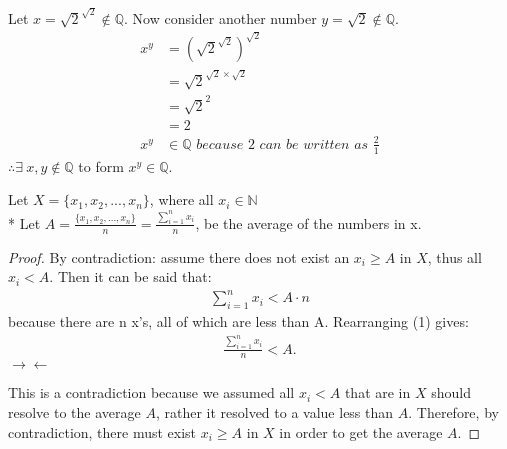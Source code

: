 \documentclass[11pt]{article}
\begin{document}
\begin{enumerate}
{{Let $x = \sqrt{2}^{\sqrt{2}} \notin \mathbb{Q}$. Now consider another number $y = \sqrt{2} \notin \mathbb{Q}$.
\begin{align*}
x^y & = (\sqrt{2}^{\sqrt{2}})^{\sqrt{2}}\\
& = \sqrt{2}^{\sqrt{2} \times \sqrt{2}} \\
& = \sqrt{2}^{2}\\
& = 2\\
x^y & \in \mathbb{Q} \textit{ because 2 can be written as } \frac{2}{1}
\end{align*}
$\therefore \exists\ x, y \notin \mathbb{Q}$ to form $x^y \in \mathbb{Q}$.
}

\item { %
Let $X = \{x_1, x_2, ..., x_n\}$, where all $x_i \in \mathbb{N}$\\*
Let $A = \frac{\{x_1, x_2, ..., x_n\}}{n} = \frac{\sum\limits_{i=1}^n x_i}{n}$, be the average of the numbers in x.

\setcounter{equation}{0}
\begin{proof}
By contradiction: assume there does not exist an $x_i \geq A$ in $X$, thus all $x_i < A$. Then it can be said that:
\begin{align}
\sum\limits_{i=1}^n x_i < A\cdot n
\end{align}
because there are n x's, all of which are less than A. Rearranging (1) gives:
\begin{align}
\frac{\sum\limits_{i=1}^n x_i}{n} < A.
\end{align} 
$\rightarrow \leftarrow$

This is a contradiction because we assumed all $x_i < A$ that are in $X$ should resolve to the average $A$, rather it resolved to a value less than $A$. Therefore, by contradiction, there must exist $x_i \geq A$ in $X$ in order to get the average $A$.
\end{proof}
}
}
\end{enumerate}
\end{document}

